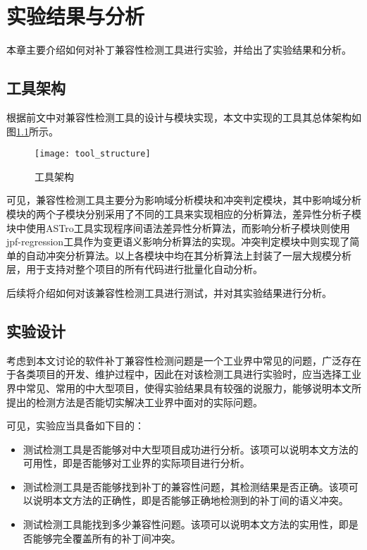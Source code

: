 \chapter{实验结果与分析}
\label {exp}
本章主要介绍如何对补丁兼容性检测工具进行实验，并给出了实验结果和分析。
\section{工具架构}
\label {exp_tool}

根据前文中对兼容性检测工具的设计与模块实现，本文中实现的工具其总体架构如图\ref {tool_structure}所示。


\begin{figure}[H]
	\centering
	\texttt{[image: tool\_structure]}
	\caption {工具架构}
	\label {tool_structure}	
\end{figure}

可见，兼容性检测工具主要分为影响域分析模块和冲突判定模块，其中影响域分析模块的两个子模块分别采用了不同的工具来实现相应的分析算法，差异性分析子模块中使用ASTro工具实现程序间语法差异性分析算法，而影响分析子模块则使用jpf-regression工具作为变更语义影响分析算法的实现。冲突判定模块中则实现了简单的自动冲突分析算法。以上各模块中均在其分析算法上封装了一层大规模分析层，用于支持对整个项目的所有代码进行批量化自动分析。

后续将介绍如何对该兼容性检测工具进行测试，并对其实验结果进行分析。

\section{实验设计}
\label {exp_des}

考虑到本文讨论的软件补丁兼容性检测问题是一个工业界中常见的问题，广泛存在于各类项目的开发、维护过程中，因此在对该检测工具进行实验时，应当选择工业界中常见、常用的中大型项目，使得实验结果具有较强的说服力，能够说明本文所提出的检测方法是否能切实解决工业界中面对的实际问题。

可见，实验应当具备如下目的：
\begin{itemize}
	\item 测试检测工具是否能够对中大型项目成功进行分析。该项可以说明本文方法的可用性，即是否能够对工业界的实际项目进行分析。
	\item 测试检测工具是否能够找到补丁的兼容性问题，其检测结果是否正确。该项可以说明本文方法的正确性，即是否能够正确地检测到的补丁间的语义冲突。
	\item 测试检测工具能找到多少兼容性问题。该项可以说明本文方法的实用性，即是否能够完全覆盖所有的补丁间冲突。
\end{itemize}

